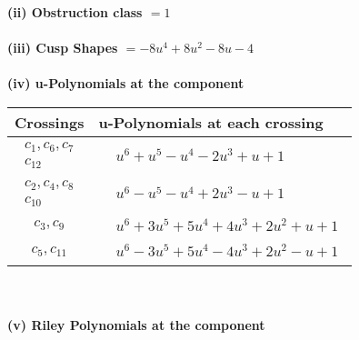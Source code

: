 \documentclass[1p]{elsarticle_modified}
\theoremstyle{definition}
\begin{document}
\flushleft \textbf{(ii) Obstruction class $= 1$}\\~\\
\flushleft \textbf{(iii) Cusp Shapes $= -8 u^4+8 u^2-8 u-4$}\\~\\
\newpage\renewcommand{\arraystretch}{1}
\flushleft \textbf{(iv) u-Polynomials at the component}\newline \\
\begin{tabular}{m{50pt}|m{274pt}}
Crossings & \hspace{64pt}u-Polynomials at each crossing \\
\hline $$\begin{aligned}c_{1},c_{6},c_{7}\\c_{12}\end{aligned}$$&$\begin{aligned}
&u^6+u^5- u^4-2 u^3+u+1
\end{aligned}$\\
\hline $$\begin{aligned}c_{2},c_{4},c_{8}\\c_{10}\end{aligned}$$&$\begin{aligned}
&u^6- u^5- u^4+2 u^3- u+1
\end{aligned}$\\
\hline $$\begin{aligned}c_{3},c_{9}\end{aligned}$$&$\begin{aligned}
&u^6+3 u^5+5 u^4+4 u^3+2 u^2+u+1
\end{aligned}$\\
\hline $$\begin{aligned}c_{5},c_{11}\end{aligned}$$&$\begin{aligned}
&u^6-3 u^5+5 u^4-4 u^3+2 u^2- u+1
\end{aligned}$\\
\hline
\end{tabular}\\~\\
\newpage\renewcommand{\arraystretch}{1}
\flushleft \textbf{(v) Riley Polynomials at the component}\newline \\
\end{document}

